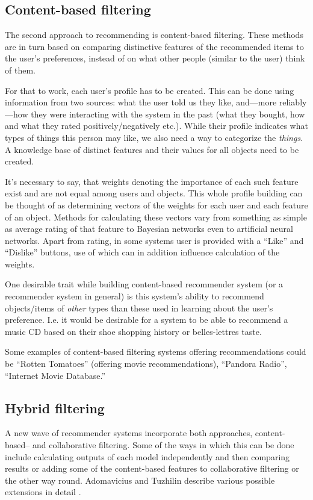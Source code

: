 \subsection{Content-based filtering}

The second approach to recommending is content-based filtering. These methods are in turn based on comparing distinctive features of the recommended items to the user's preferences, instead of on what other people (similar to the user) think of them.

For that to work, each user's profile has to be created. This can be done using information from two sources: what the user told us they like, and---more reliably---how they were interacting with the system in the past (what they bought, how and what they rated positively/negatively etc.). While their profile indicates what types of things this person may like, we also need a way to categorize the \emph{things}. A knowledge base of distinct features and their values for all objects need to be created.

It's necessary to say, that weights denoting the importance of each such feature exist and are not equal among users and objects. This whole profile building can be thought of as determining vectors of the weights for each user and each feature of an object. Methods for calculating these vectors vary from something as simple as average rating of that feature to Bayesian networks even to artificial neural networks. Apart from rating, in some systems user is provided with a ``Like'' and ``Dislike'' buttons, use of which can in addition influence calculation of the weights.

One desirable trait while building content-based recommender system (or a recommender system in general) is this system's ability to recommend objects/items of \emph{other} types than these used in learning about the user's preference. I.e. it would be desirable for a system to be able to recommend a music CD based on their shoe shopping history or belles-lettres taste.

Some examples of content-based filtering systems offering recommendations could be ``Rotten Tomatoes'' (offering movie recommendations), ``Pandora Radio'', ``Internet Movie Database.''

\subsection{Hybrid filtering}

A new wave of recommender systems incorporate both approaches, content-based-- and collaborative filtering. Some of the ways in which this can be done include calculating outputs of each model independently and then comparing results or adding some of the content-based features to collaborative filtering or the other way round. Adomavicius and Tuzhilin describe various possible extensions in detail \cite{Adomavicius:recommenders}.
